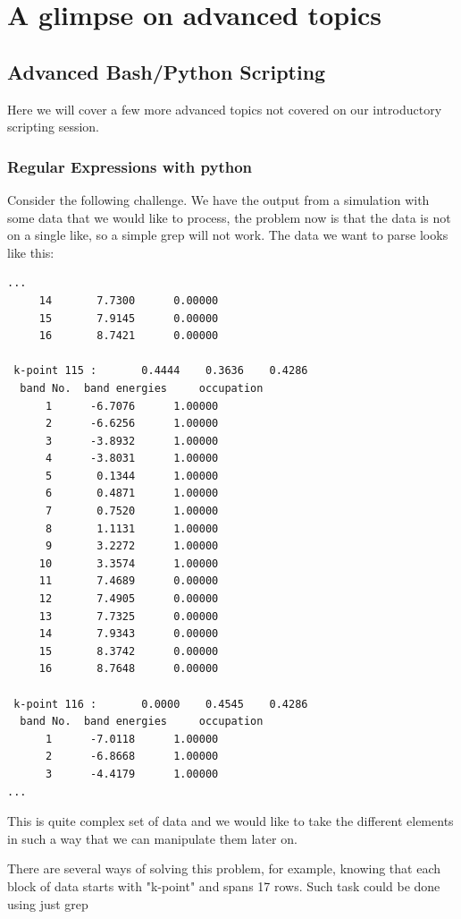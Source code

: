\chapter{A glimpse on advanced topics}

\section{Advanced Bash/Python Scripting}

Here we will cover a few more advanced topics not covered on our introductory scripting session. 

\subsection{Regular Expressions with python}

Consider the following challenge.
We have the output from a simulation with some data that we would like to process, the problem now is that the data is not on a single like, so a simple grep will not work. The data we want to parse looks like this:

\begin{lstlisting}
...
     14       7.7300      0.00000
     15       7.9145      0.00000
     16       8.7421      0.00000

 k-point 115 :       0.4444    0.3636    0.4286
  band No.  band energies     occupation 
      1      -6.7076      1.00000
      2      -6.6256      1.00000
      3      -3.8932      1.00000
      4      -3.8031      1.00000
      5       0.1344      1.00000
      6       0.4871      1.00000
      7       0.7520      1.00000
      8       1.1131      1.00000
      9       3.2272      1.00000
     10       3.3574      1.00000
     11       7.4689      0.00000
     12       7.4905      0.00000
     13       7.7325      0.00000
     14       7.9343      0.00000
     15       8.3742      0.00000
     16       8.7648      0.00000

 k-point 116 :       0.0000    0.4545    0.4286
  band No.  band energies     occupation 
      1      -7.0118      1.00000
      2      -6.8668      1.00000
      3      -4.4179      1.00000
...
\end{lstlisting}

This is quite complex set of data and we would like to take the different elements in such a way that we can manipulate them later on.

There are several ways of solving this problem, for example, knowing that each block of data starts with "k-point"
 and spans 17 rows. Such task could be done using just grep
 
